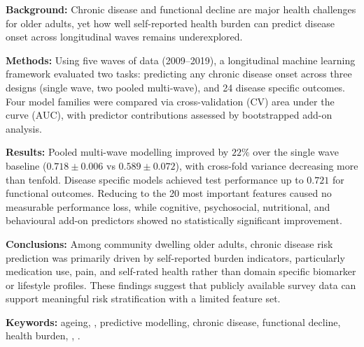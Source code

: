 
\begin{abstracts}        %

\textbf{Background:} Chronic disease and functional decline are major health challenges for older adults, yet how well self-reported health burden can predict disease onset across longitudinal waves remains underexplored.

\textbf{Methods:} Using five waves of data (2009--2019), a longitudinal machine learning framework evaluated two tasks: predicting any chronic disease onset across three designs (single wave, two pooled multi-wave), and 24 disease specific outcomes. Four model families were compared via cross-validation (CV) area under the curve (AUC), with predictor contributions assessed by bootstrapped add-on analysis.

\textbf{Results:} Pooled multi-wave modelling improved by $22\%$ over the single wave baseline ($0.718 \pm 0.006$ vs $0.589 \pm 0.072$), with cross-fold variance decreasing more than tenfold. Disease specific models achieved test performance up to $0.721$ for functional outcomes. Reducing to the 20 most important features caused no measurable performance loss, while cognitive, psychosocial, nutritional, and behavioural add-on predictors showed no statistically significant improvement.

\textbf{Conclusions:} Among community dwelling older adults, chronic disease risk prediction was primarily driven by self-reported burden indicators, particularly medication use, pain, and self-rated health rather than domain specific biomarker or lifestyle profiles. These findings suggest that publicly available survey data can support meaningful risk stratification with a limited feature set.

\textbf{Keywords:} ageing, , predictive modelling, chronic disease, functional decline, health burden, , .

\end{abstracts}

